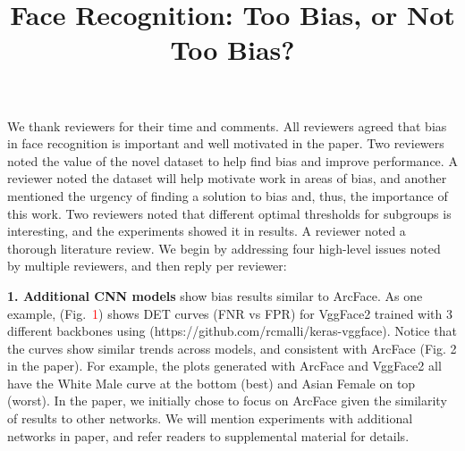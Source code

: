 \documentclass[10pt,twocolumn,letterpaper]{article}
\newcommand{\ie}{\textit{i}.\textit{e}., }
\begin{document}
\title{Face Recognition: Too Bias, or Not Too Bias?}

\maketitle

    
\thispagestyle{empty}


We thank reviewers for their time and comments. All reviewers agreed that bias in face recognition is important and well motivated in the paper. Two reviewers noted the value of the novel dataset to help find bias and improve performance. A reviewer noted the dataset will help motivate work in areas of bias, and another mentioned the urgency of finding a solution to bias and, thus, the importance of this work. Two reviewers noted that different optimal thresholds for subgroups is interesting, and the experiments showed it in results. A reviewer noted a thorough literature review. We begin by addressing four high-level issues noted by multiple reviewers, and then reply per reviewer:

\vspace{0.2mm}

\noindent\textbf{1. Additional CNN models} show bias results similar to ArcFace. As one example, (Fig.~\textcolor{red}{1}) shows DET curves (FNR vs FPR) for VggFace2 trained with 3 different backbones using (https://github.com/rcmalli/keras-vggface). Notice that the curves show similar trends across models, and consistent with  ArcFace (Fig. 2 in the paper). For example, the plots generated with ArcFace and VggFace2 all have the White Male curve at the bottom (best) and Asian Female on top (worst). In the paper, we initially chose to focus on ArcFace given the similarity of results to other networks. We will mention experiments with additional networks in paper, and refer readers to supplemental material for details.
\end{document}
